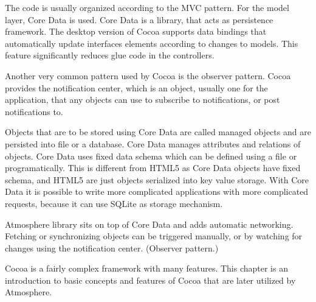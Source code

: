 The code is usually organized according to the MVC pattern. For the model layer, Core Data is used. Core Data is a library, that acts as persistence framework. The desktop version of Cocoa supports data bindings that automatically update interfaces elements according to changes to models. This feature significantly reduces glue code in the controllers.

Another  very common pattern used by Cocoa is the observer pattern. Cocoa provides the notification center, which is an object, usually one for the application, that any objects can use to subscribe to notifications, or post notifications to. 

Objects that are to be stored using Core Data are called managed objects and are persisted into file or a database. Core Data manages attributes and relations of objects. Core Data uses fixed data schema which can be defined using a file or programatically. This is different from HTML5 as Core Data objects have fixed schema, and HTML5 are just objects serialized into key value storage. With Core Data it is possible to write more complicated applications with more complicated requests, because it can use SQLite as storage mechanism.

Atmosphere library sits on top of Core Data and adds automatic networking. Fetching or synchronizing objects can be triggered manually, or by watching  for changes using the notification center. (Observer pattern.)

Cocoa is a fairly complex framework with many features. This chapter is an introduction to basic concepts and features of Cocoa that are later utilized by Atmosphere. 